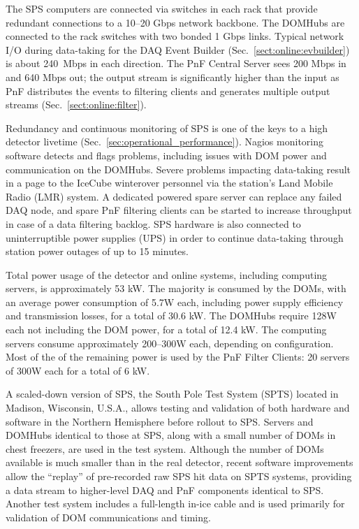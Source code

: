 The SPS computers are connected via switches in each rack that provide
redundant connections to a 10--20 Gbps network backbone.  The DOMHubs are
connected to the rack switches with two bonded 1 Gbps links.  Typical network I/O during
data-taking for the DAQ Event Builder (Sec.~\ref{sect:online:evbuilder}) is about 240~Mbps in each direction.
The PnF Central Server sees 200 Mbps in and 640 Mbps out; the output
stream is significantly higher than the input as PnF distributes the
events to filtering clients and generates multiple output streams
(Sec.~\ref{sect:online:filter}).  

Redundancy and continuous monitoring of SPS is one of the keys to a high
detector livetime (Sec.~\ref{sec:operational_performance}).
Nagios monitoring software detects and flags problems, 
including issues with DOM power and communication on the DOMHubs.  Severe
problems impacting data-taking result in a page to the IceCube winterover 
personnel via the station's Land Mobile Radio (LMR) system.  A dedicated
powered spare server can replace any failed DAQ node, and spare PnF filtering
clients can be started to increase throughput in case of a data filtering
backlog.  SPS hardware is also connected to uninterruptible
power supplies (UPS) in order to continue data-taking through station power
outages of up to 15 minutes.

Total power usage of the detector and online systems, including computing servers, is
approximately 53 kW.  The majority is consumed by the DOMs, with an
average power consumption of 5.7W each, including power supply efficiency
and transmission losses, for a total of 30.6 kW.  The DOMHubs require 128W
each not including the DOM power, for a total of 12.4 kW.  The
computing servers consume approximately 200--300W each, depending on
configuration.  Most of the of the remaining power is used by the PnF
Filter Clients: 20 servers of 300W each for a total of 6 kW.

A scaled-down version of SPS, the South Pole Test System (SPTS) located in
Madison, Wisconsin, U.S.A., allows testing and validation of both hardware
and software in the Northern Hemisphere before rollout to SPS.  Servers and DOMHubs
identical to those at SPS, along with a small number of DOMs in chest
freezers, are used in the test system.  Although the number of DOMs
available is much smaller than in the real detector, recent software
improvements allow the ``replay'' of pre-recorded raw SPS hit data
on SPTS systems, providing a data stream to higher-level DAQ and PnF
components identical to SPS.  Another test system includes a full-length
in-ice cable and is used primarily for validation of DOM communications and
timing.

